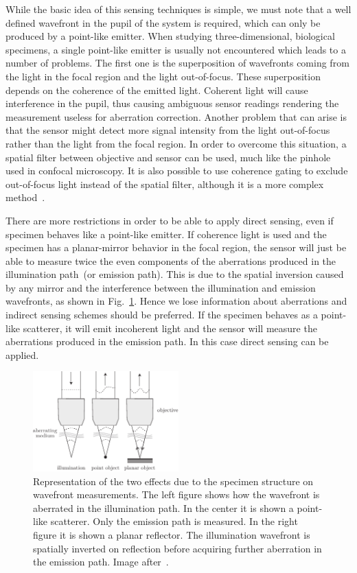 While the basic idea of this sensing techniques is simple, we must note that a well defined wavefront in the pupil of the system is required, which can only be produced by a point-like emitter. When studying three-dimensional, biological specimens, a single point-like emitter is usually not encountered which leads to a number of problems. The first one is the superposition of wavefronts coming from the light in the focal region and the light out-of-focus. These superposition depends on the coherence of the emitted light. Coherent light will cause interference in the pupil, thus causing ambiguous sensor readings rendering the measurement useless for aberration correction. Another problem that can arise is that the sensor might detect more signal intensity from the light out-of-focus rather than the light from the focal region. In order to overcome this situation, a spatial filter between objective and sensor can be used, much like the pinhole used in confocal microscopy. It is also possible to use coherence gating to exclude out-of-focus light instead of the spatial filter, although it is a more complex method~\cite{scan_TPFM_gated_wavefront}. 

There are more restrictions in order to be able to apply direct sensing, even if specimen behaves like a point-like emitter.  If coherence light is used and the specimen has a planar-mirror behavior in the focal region, the sensor will just be able to measure twice the even components of the aberrations produced in the illumination path~(or emission path). This is due to the spatial inversion caused by any mirror and the interference between the illumination and emission wavefronts, as shown in Fig.~\ref{fig:abe_direct_sensing}. Hence we lose information about aberrations and indirect sensing schemes should be preferred. If the specimen behaves as a point-like scatterer, it will emit incoherent light and the sensor will measure the aberrations produced in the emission path. In this case direct sensing can be applied.  

\begin{figure}[htbp]
	\centering
		\includegraphics[width=0.50\textwidth]{images/abe_direct_sensing}
	\caption{Representation of the two effects due to the specimen structure on wavefront measurements. The left figure shows how the wavefront is aberrated in the illumination path. In the center it is shown a point-like scatterer. Only the emission path is measured. In the right figure it is shown a planar reflector. The illumination wavefront is spatially inverted on reflection before acquiring further aberration in the emission path. Image after~\cite{AOM_basic_ref}.}
	\label{fig:abe_direct_sensing}
\end{figure}

